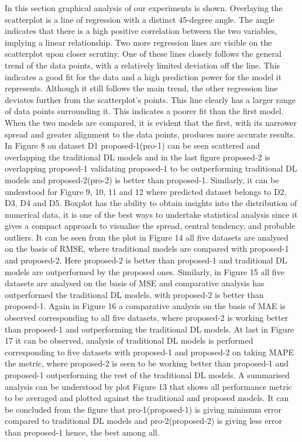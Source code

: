 \documentclass[a4paper, fleqn]{cas-sc}
\begin{document}
In this section graphical analysis of our experiments is shown. Overlaying the scatterplot is a line of regression with a distinct 45-degree angle. The angle indicates that there is a high positive correlation between the two variables,  implying a linear relationship. Two more regression lines are visible on the scatterplot upon closer scrutiny. One of these lines closely follows the general trend of the data points,  with a relatively limited deviation off the line. This indicates a good fit for the data and a high prediction power for the model it represents. Although it still follows the main trend,  the other regression line deviates further from the scatterplot's points. This line clearly has a larger range of data points surrounding it. This indicates a poorer fit than the first model. When the two models are compared,  it is evident that the first,  with its narrower spread and greater alignment to the data points,  produces more accurate results. In Figure 8 on dataset D1 proposed-1(pro-1) can be seen scattered and overlapping the traditional DL models and in the last figure proposed-2 is overlapping proposed-1 validating proposed-1 to be outperforming traditional DL models and proposed-2(pro-2) is better than proposed-1. Similarly,  it can be understood for Figure 9,  10,  11 and 12 where predicted dataset belongs to D2,  D3,  D4 and D5. Boxplot has the ability to obtain insights into the distribution of numerical data,  it is one of the best ways to undertake statistical analysis since it gives a compact approach to visualise the spread,  central tendency,  and probable outliers. It can be seen from the plot in Figure 14 all five datasets are analysed on the basis of RMSE,  where traditional models are compared with proposed-1 and proposed-2. Here proposed-2 is better than proposed-1 and traditional DL models are outperformed by the proposed ones. Similarly,  in Figure 15 all five datasets are analysed on the basis of MSE and comparative analysis has outperformed the traditional DL models,  with proposed-2 is better than proposed-1. Again in Figure 16 a comparative analysis on the basis of MAE is observed corresponding to all five datasets,  where proposed-2 is working better than proposed-1 and outperforming the traditional DL models. At last in Figure 17 it can be observed,  analysis of traditional DL models is performed corresponding to five datasets with proposed-1 and proposed-2 on taking MAPE the metric,  where proposed-2 is seen to be working better than proposed-1 and proposed-1 outperforming the rest of the traditional DL models. A summarised analysis can be understood by plot Figure 13 that shows all performance metric to be averaged and plotted against the traditional and proposed models. It can be concluded from the figure that pro-1(proposed-1) is giving minimum error compared to traditional DL models and pro-2(proposed-2) is giving less error than proposed-1 hence, the best among all.
 
\end{document}
